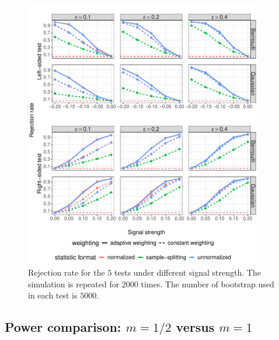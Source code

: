 \documentclass[12pt]{article}
\begin{document}
\begin{figure}[!ht]
	\centering
	\includegraphics[width=0.93\textwidth]{figures-and-tables/simulation/eps_greedy_rejection_plot.pdf}

	\caption{Rejection rate for the $5$ tests under different signal strength. The simulation is repeated for $2000$ times. The number of bootstrap used in each test is $5000$.}
	\label{fig:simulation-rejection-plot-eps-greedy}
\end{figure}

\newpage 

\subsection{Power comparison: $m=1/2$ versus $m=1$}\label{sec:power-comparison}
\end{document}
